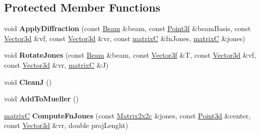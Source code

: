 \subsection*{Protected Member Functions}
\begin{DoxyCompactItemize}
\item 
\mbox{\label{class_handler_p_o_a65a3e8c8a580a321b315f8afe89dd34e}} 
void {\bfseries Apply\+Diffraction} (const \mbox{\hyperlink{class_beam}{Beam}} \&beam, const \mbox{\hyperlink{struct_point3f}{Point3f}} \&beam\+Basis, const \mbox{\hyperlink{struct_point3d}{Vector3d}} \&vf, const \mbox{\hyperlink{struct_point3d}{Vector3d}} \&vr, const \mbox{\hyperlink{classmatrix_c}{matrixC}} \&fn\+Jones, \mbox{\hyperlink{classmatrix_c}{matrixC}} \&jones)
\item 
\mbox{\label{class_handler_p_o_a50d3c2cdc831fffb663487f75d47513a}} 
void {\bfseries Rotate\+Jones} (const \mbox{\hyperlink{class_beam}{Beam}} \&beam, const \mbox{\hyperlink{struct_point3f}{Vector3f}} \&T, const \mbox{\hyperlink{struct_point3d}{Vector3d}} \&vf, const \mbox{\hyperlink{struct_point3d}{Vector3d}} \&vr, \mbox{\hyperlink{classmatrix_c}{matrixC}} \&J)
\item 
\mbox{\label{class_handler_p_o_a82d6ec400230d75e175f1f4ab300e323}} 
void {\bfseries CleanJ} ()
\item 
\mbox{\label{class_handler_p_o_a01b025f232ece30a670b53f4acdf4e78}} 
void {\bfseries Add\+To\+Mueller} ()
\item 
\mbox{\label{class_handler_p_o_a38248eea6a5b4a2cd53f4cfc57c66a4d}} 
\mbox{\hyperlink{classmatrix_c}{matrixC}} {\bfseries Compute\+Fn\+Jones} (const \mbox{\hyperlink{class_matrix2x2c}{Matrix2x2c}} \&jones, const \mbox{\hyperlink{struct_point3d}{Point3d}} \&center, const \mbox{\hyperlink{struct_point3d}{Vector3d}} \&vr, double proj\+Lenght)
\end{DoxyCompactItemize}
